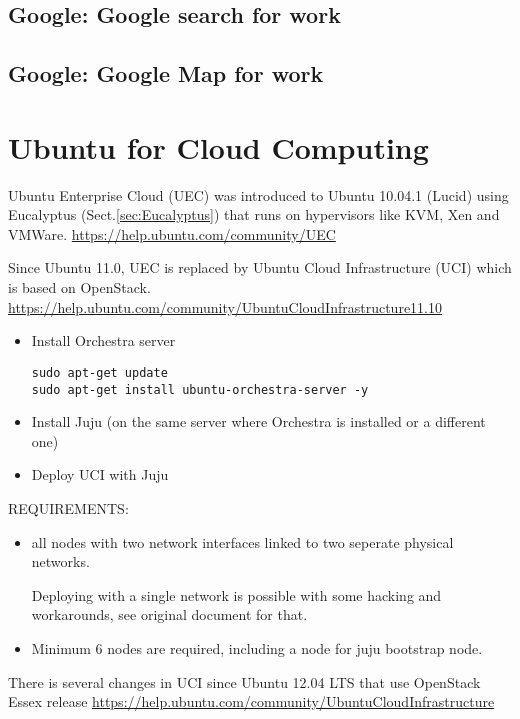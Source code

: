 \subsection{Google: Google search for work}

\subsection{Google: Google Map for work}
 


\section{Ubuntu for Cloud Computing}

Ubuntu Enterprise Cloud (UEC) was introduced to Ubuntu 10.04.1 (Lucid) using
Eucalyptus (Sect.\ref{sec:Eucalyptus}) that runs on hypervisors like KVM, Xen
and VMWare. 
\url{https://help.ubuntu.com/community/UEC}

Since Ubuntu 11.0, UEC is replaced by Ubuntu Cloud Infrastructure (UCI) which is
based on OpenStack.
\url{https://help.ubuntu.com/community/UbuntuCloudInfrastructure11.10}
\begin{itemize}
  \item Install Orchestra server
\begin{verbatim}
sudo apt-get update
sudo apt-get install ubuntu-orchestra-server -y
\end{verbatim}  
  
  \item Install Juju (on the same server where Orchestra is installed or a
  different one)
  
  \item Deploy UCI with Juju
\end{itemize}
REQUIREMENTS:
\begin{itemize}
  \item  all nodes with two network interfaces linked to two seperate physical
  networks. 
  
  Deploying with a single network is possible with some hacking and workarounds,
  see original document for that. 
  
  \item Minimum 6 nodes are required, including a node for juju bootstrap node.
\end{itemize}

There is several changes in UCI since Ubuntu 12.04 LTS that use OpenStack
Essex release 
\url{https://help.ubuntu.com/community/UbuntuCloudInfrastructure}



